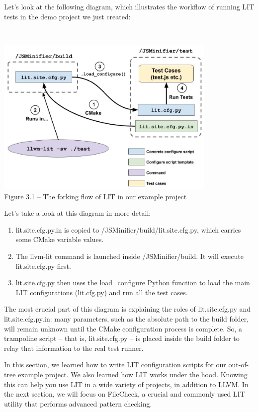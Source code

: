 Let's look at the following diagram, which illustrates the workflow of running LIT tests in the demo project we just created:

\hspace*{\fill} \\ %
\begin{center}
\includegraphics[width=0.8\textwidth]{content/1/chapter3/images/1.jpg}\\
Figure 3.1 – The forking flow of LIT in our example project
\end{center}

Let's take a look at this diagram in more detail:

\begin{enumerate}
\item lit.site.cfg.py.in is copied to /JSMinifier/build/lit.site.cfg.py, which carries some CMake variable values.
\item The llvm-lit command is launched inside /JSMinifier/build. It will execute lit.site.cfg.py first.
\item lit.site.cfg.py then uses the load\_configure Python function to load the main LIT configurations (lit.cfg.py) and run all the test cases.
\end{enumerate}

The most crucial part of this diagram is explaining the roles of lit.site.cfg.py and lit.site.cfg.py.in: many parameters, such as the absolute path to the build folder, will remain unknown until the CMake configuration process is complete. So, a trampoline script – that is, lit.site.cfg.py – is placed inside the build folder to relay that information to the real test runner.

In this section, we learned how to write LIT configuration scripts for our out-of-tree example project. We also learned how LIT works under the hood. Knowing this can help you use LIT in a wide variety of projects, in addition to LLVM. In the next section, we will focus on FileCheck, a crucial and commonly used LIT utility that performs advanced pattern checking.






